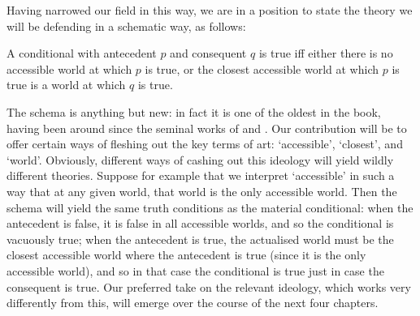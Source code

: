 \documentclass[If.tex]{subfiles}
\begin{document}
Having narrowed our field in this way, we are in a position to state the theory we will be defending in a schematic way, as follows:
\begin{prop} 
	\litem[CLOSEST] \label{ourview}
	A conditional with antecedent $p$ and consequent $q$ is true iff either there is no accessible world at which $p$ is true, or the closest accessible world at which $p$ is true is a world at which $q$ is true. 
\end{prop}
The schema is anything but new: in fact it is one of the oldest in the book, having been around since the seminal works of \cite{StalnakerTC} and \citet{LewisCounterfactuals}.  Our contribution will be to offer certain ways of fleshing out the key terms of art: ‘accessible’, ‘closest’, and ‘world’. Obviously, different ways of cashing out this ideology will yield wildly different theories. Suppose for example that we interpret ‘accessible’ in such a way that at any given world, that world is the only accessible world. Then the schema will yield the same truth conditions as the material conditional: when the antecedent is false, it is false in all accessible worlds, and so the conditional is vacuously true; when the antecedent is true, the actualised world must be the closest accessible world where the antecedent is true (since it is the only accessible world), and so in that case the conditional is true just in case the consequent is true. Our preferred take on the relevant ideology, which works very differently from this, will emerge over the course of the next four chapters.
\end{document}
